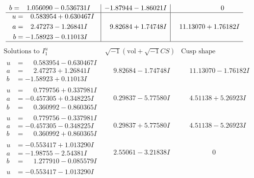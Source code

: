 \documentclass[1p]{elsarticle_modified}
\theoremstyle{definition}
\newcommand{\I}{\sqrt{-1}}
\begin{document}
$$\begin{array}{c|c|c}
\begin{aligned}
b &= \phantom{-}1.056090 - 0.536731 I\end{aligned}
 & -1.87944 - 1.86021 I & \phantom{-0.000000 } 0 \\ \hline\begin{aligned}
u &= \phantom{-}0.583954 + 0.630467 I \\
a &= \phantom{-}2.47273 - 1.26841 I \\
b &= -1.58923 - 0.11013 I\end{aligned}
 & \phantom{-}9.82684 + 1.74748 I & \phantom{-}11.13070 + 1.76182 I\\
 \hline 
 \end{array}$$\newpage$$\begin{array}{c|c|c}  
\text{Solutions to }I^u_{1}& \I (\text{vol} + \sqrt{-1}CS) & \text{Cusp shape}\\
 \hline 
\begin{aligned}
u &= \phantom{-}0.583954 - 0.630467 I \\
a &= \phantom{-}2.47273 + 1.26841 I \\
b &= -1.58923 + 0.11013 I\end{aligned}
 & \phantom{-}9.82684 - 1.74748 I & \phantom{-}11.13070 - 1.76182 I \\ \hline\begin{aligned}
u &= \phantom{-}0.779756 + 0.337981 I \\
a &= -0.457305 + 0.348225 I \\
b &= \phantom{-}0.360992 - 0.860365 I\end{aligned}
 & \phantom{-}0.29837 - 5.77580 I & \phantom{-}4.51138 + 5.26923 I \\ \hline\begin{aligned}
u &= \phantom{-}0.779756 - 0.337981 I \\
a &= -0.457305 - 0.348225 I \\
b &= \phantom{-}0.360992 + 0.860365 I\end{aligned}
 & \phantom{-}0.29837 + 5.77580 I & \phantom{-}4.51138 - 5.26923 I \\ \hline\begin{aligned}
u &= -0.553417 + 1.013290 I \\
a &= -1.98755 - 2.54381 I \\
b &= \phantom{-}1.277910 - 0.085579 I\end{aligned}
 & \phantom{-}2.55061 - 3.21838 I & \phantom{-0.000000 } 0 \\ \hline\begin{aligned}
u &= -0.553417 - 1.013290 I \\

\end{aligned}
\end{array}$$
\end{document}
